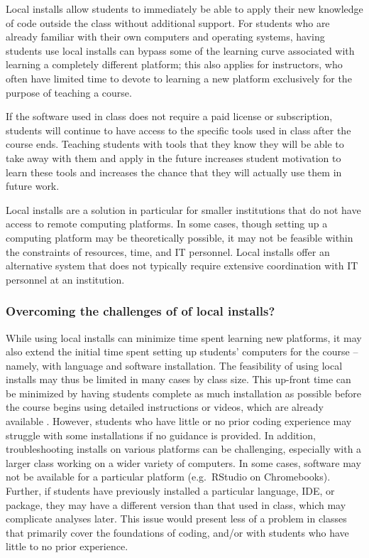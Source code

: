Local installs allow students to immediately be able to apply their new knowledge of code outside the class without additional support. For students who are already familiar with their own computers and operating systems, having students use local installs can bypass some of the learning curve associated with learning a completely different platform; this also applies for instructors, who often have limited time to devote to learning a new platform exclusively for the purpose of teaching a course.

If the software used in class does not require a paid license or subscription, students will continue to have access to the specific tools used in class after the course ends. Teaching students with tools that they know they will be able to take away with them and apply in the future increases student motivation to learn these tools and increases the chance that they will actually use them in future work.

Local installs are a solution in particular for smaller institutions that do not have access to remote computing platforms. In some cases, though setting up a computing platform may be theoretically possible, it may not be feasible within the constraints of resources, time, and IT personnel. Local installs offer an alternative system that does not typically require extensive coordination with IT personnel at an institution.

\subsubsection{Overcoming the challenges of of local installs?} 

While using local installs can minimize time spent learning new platforms, it may also extend the initial time spent setting up students' computers for the course -- namely, with language and software installation. The feasibility of using local installs may thus be limited in many cases by class size. This up-front time can be minimized by having students complete as much installation as possible before the course begins
using detailed instructions or videos, which are already available .
However, students who have little or no prior coding experience may struggle with some installations if no guidance is provided. In addition, troubleshooting installs on various platforms can be challenging, especially with a larger class working on a wider variety of computers. 
In some cases, software may not be available for a particular platform (e.g.\ RStudio on Chromebooks).
Further, if students have previously installed a particular language, IDE, or package, they may have a different version than that used in class, which may complicate analyses later. This issue would present less of a problem in classes that primarily cover the foundations of coding, and/or with students who have little to no prior experience.

